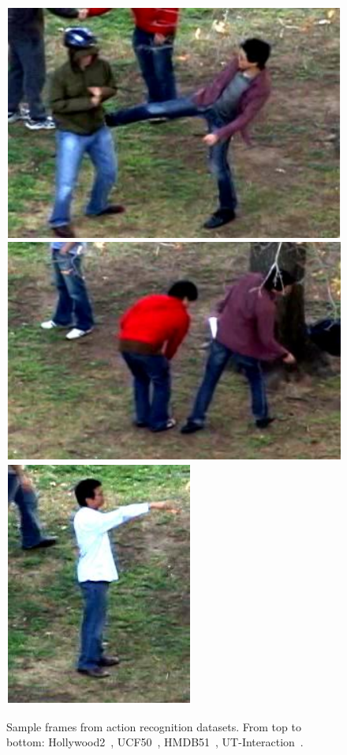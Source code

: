 \documentclass[10pt,twocolumn,letterpaper]{article}
\begin{document}
\begin{figure}[!t]
\begin{center}
\includegraphics[scale=0.3]{figures/dataset_thumb/uti/crop_class4.pdf} 
\includegraphics[scale=0.3]{figures/dataset_thumb/uti/crop_class5.pdf} 
\includegraphics[scale=0.3]{figures/dataset_thumb/uti/crop_class6.pdf} \\
\smallskip
\caption{Sample frames from action recognition datasets. From top to bottom: Hollywood2~\cite{Marszalek09}, UCF50~\cite{Reddy12}, HMDB51~\cite{Kuehne11}, UT-Interaction~\cite{Ryoo10}.\vspace{-.5cm}}
\label{fig:datasets}
\end{center}
\end{figure}
\end{document}
